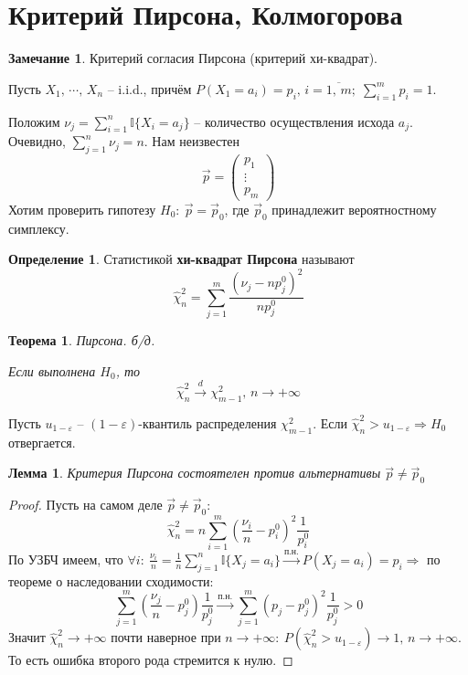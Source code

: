 \documentclass[a4paper,12pt]{article}
\theoremstyle{plain}
\newtheorem{theorem}{Теорема}[section]
\newtheorem{lemma}{Лемма}[section]
\theoremstyle{definition}
\newtheorem{definition}{Определение}[section]
\newtheorem*{note}{Замечание}
\theoremstyle{remark}
\begin{document}
\section{Критерий Пирсона, Колмогорова}
\begin{note}
  Критерий согласия Пирсона (критерий хи-квадрат).

  Пусть $X_1,\,\cdots,\,X_n$ -- i.i.d., причём $P(X_1 = a_i) = p_i,\, i =\overline{1,\,m};\; \sum_{i = 1}^m p_i = 1$.

  Положим $\nu_j = \sum_{i = 1}^n \mathbb{I}\{X_i = a_j\}$ -- количество осуществления исхода $a_j$. Очевидно, $\sum_{j = 1}^n \nu_j = n$. Нам неизвестен
  \[
    \vec{p} = \begin{pmatrix}
      p_1\\
      \vdots\\
      p_m
    \end{pmatrix}
  \]
  Хотим проверить гипотезу $H_0 :\: \vec{p} = \vec{p}_0$, где $\vec{p}_0$ принадлежит вероятностному симплексу.
\end{note}

\begin{definition}
  Статистикой \textbf{хи-квадрат Пирсона} называют
  \[
    \hat{\chi}^2_n = \sum_{j = 1}^m\frac{(\nu_j - np_j^0)^2}{np_j^0}
  \]
\end{definition}

\begin{theorem}
  Пирсона. б/д.

  Если выполнена $H_0$, то 
  \[
    \hat{\chi}^2_n \overset{d}{\to} \chi^2_{m - 1},\, n \to +\infty
  \]
\end{theorem}

Пусть $u_{1 - \varepsilon}$ -- $(1 - \varepsilon)$-квантиль распределения $\chi^2_{m - 1}$. Если $\hat{\chi}^2_{n} > u_{1 - \varepsilon} \Rightarrow H_0$ отвергается.

\begin{lemma}
  Критерия Пирсона состоятелен против альтернативы $\vec{p} \neq \vec{p}_0$
\end{lemma}

\begin{proof}
  Пусть на самом деле $\vec{p} \neq \vec{p}_0$:
  \[
    \hat{\chi}^2_n = n\sum_{i = 1}^m\left(\frac{\nu_i}{n} - p_i^0\right)^2\frac{1}{p_i^0}
  \]
  По УЗБЧ имеем, что $\forall i :\: \frac{\nu_i}{n} = \frac{1}{n}\sum_{j = 1}^n\mathbb{I}\{X_j = a_i\} \overset{\text{п.н.}}{\to} P(X_j = a_i) = p_i \Rightarrow$ по теореме о наследовании сходимости:
  \[
    \sum_{j = 1}^m\left(\frac{\nu_j}{n} - p_j^0\right)\frac{1}{p_j^0} \overset{\text{п.н.}}{\to} \sum_{j = 1}^m(p_j - p_j^0)^2\frac{1}{p_j^0} > 0
  \]
  Значит $\hat{\chi}^2_n \to +\infty$ почти наверное при $n \to +\infty :\: P(\hat{\chi}^2_n > u_{1 - \varepsilon}) \to 1,\, n \to +\infty$. То есть ошибка второго рода стремится к нулю.
\end{proof}
\end{document}
